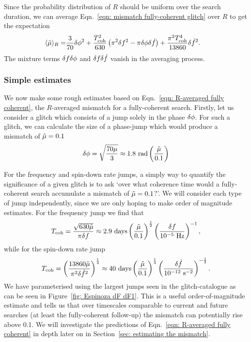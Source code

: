 \documentclass[../full_thesis/full_thesis.tex]{subfiles}
\begin{document}
Since the probability distribution of
$R$ should be uniform over the search duration, we can average Eqn.~\eqref{eqn:
mismatch fully-coherent glitch} over $R$ to get the expectation
\begin{align}
\langle \tilde{\mu} \rangle_{R} = &
\frac{3}{70}\delta\phi^{2}
+ \frac{T_{\mathrm{coh}}^{2}}{630}\left(\pi^{2}\delta f^{2}
- \pi\delta\phi\delta\dot{f}\right)
+ \frac{\pi^{2}T_{\mathrm{coh}}^{4}}{13860} \delta\dot{f}^{2}.
\label{eqn: R-averaged fully coherent}
\end{align}
The mixture terms $\delta f\delta\phi$ and
$\delta f\delta\dot{f}$ vanish in the averaging process.

\subsubsection{Simple estimates}

We now make some rough estimates based on Eqn.~\eqref{eqn: R-averaged
fully coherent}, the $R$-averaged mismatch for a fully-coherent search.
Firstly, let us consider a glitch which consists of a jump solely in the phase
$\delta\phi$. For such a glitch, we can calculate the size of a phase-jump
which would produce a mismatch of $\tilde{\mu}=0.1$
\begin{align}
\delta\phi =
\sqrt{\frac{70\mu}{3}} \approx 1.8 \textrm{ rad} \left(\frac{\tilde{\mu}}{0.1}\right)
\end{align}

For the frequency and spin-down rate jumps,
a simply way to quantify the significance of a given glitch is to ask `over
what coherence time would a fully-coherent search accumulate a mismatch of
$\tilde{\mu}=0.1$?'. We will consider each type of jump independently, since we are
only hoping to make order of magnitude estimates.
For the frequency jump we find that
\begin{align}
T_\textrm{coh} = \frac{\sqrt{630 \tilde{\mu}}}{\pi\delta f}
\approx 2.9 \textrm{ days} \left(\frac{\tilde{\mu}}{0.1}\right)^{\frac{1}{2}}
\left(\frac{\delta f}{10^{-5} \textrm{ Hz}}\right)^{-1},
\end{align}
while for the spin-down rate jump
\begin{align}
T_\textrm{coh} =
\left(\frac{13860 \tilde{\mu}}{\pi^{2}\delta\dot{f}^{2}}\right)^{\frac{1}{4}}
\approx 40 \textrm{ days} \left(\frac{\tilde{\mu}}{0.1}\right)^{\frac{1}{4}}
\left(\frac{\delta\dot{f}}{10^{-12} \textrm{ s}^{-2}}\right)^{-\frac{1}{2}}.
\end{align}
We have parameterised using the largest jumps seen in the glitch-catalogue as
can be seen in Figure~\ref{fig: Espinoza dF dF1}. This is a useful
order-of-magnitude estimate and tells us that over timescales comparable to
current and future searches (at least the fully-coherent follow-up) the
mismatch can potentially rise above 0.1.  We will investigate the predictions
of Eqn.~\eqref{eqn: R-averaged fully coherent} in depth later on in
Section~\ref{sec: estimating the mismatch}.
\end{document}
